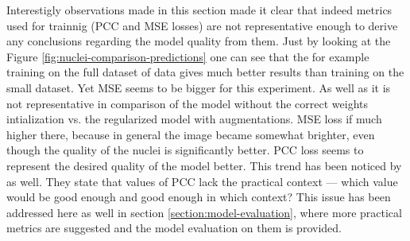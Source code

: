 Interestigly observations made in this section made it clear that indeed metrics used for trainnig (PCC and MSE losses) are not representative enough to derive any conclusions regarding the model quality from them. Just by looking at the Figure \ref{fig:nuclei-comparison-predictions} one can see that the for example training on the full dataset of data gives much better results than training on the small dataset. Yet MSE seems to be bigger for this experiment. As well as it is not representative in comparison of the model without the correct weights intialization vs. the regularized model with augmentations. MSE loss if much higher there, because in general the image became somewhat brighter, even though the quality of the nuclei is significantly better. PCC loss seems to represent the desired quality of the model better. This trend has been noticed by \cite{Lachance_2020} as well. They state that values of PCC lack the practical context --- which value would be good enough and good enough in which context? This issue has been addressed here as well in section \ref{section:model-evaluation}, where more practical metrics are suggested and the model evaluation on them is provided.
